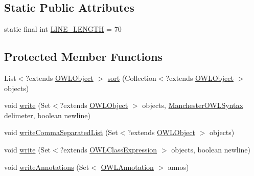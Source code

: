 \subsection*{Static Public Attributes}
\begin{DoxyCompactItemize}
\item 
static final int \hyperlink{classuk_1_1ac_1_1manchester_1_1cs_1_1owl_1_1owlapi_1_1mansyntaxrenderer_1_1_manchester_o_w_l_syntax_object_renderer_a8238358079714a9f748dca237bc812c1}{L\-I\-N\-E\-\_\-\-L\-E\-N\-G\-T\-H} = 70
\end{DoxyCompactItemize}
\subsection*{Protected Member Functions}
\begin{DoxyCompactItemize}
\item 
List$<$?extends \hyperlink{interfaceorg_1_1semanticweb_1_1owlapi_1_1model_1_1_o_w_l_object}{O\-W\-L\-Object} $>$ \hyperlink{classuk_1_1ac_1_1manchester_1_1cs_1_1owl_1_1owlapi_1_1mansyntaxrenderer_1_1_manchester_o_w_l_syntax_object_renderer_a65c526c7a3ef41403f52b64454b7b5df}{sort} (Collection$<$?extends \hyperlink{interfaceorg_1_1semanticweb_1_1owlapi_1_1model_1_1_o_w_l_object}{O\-W\-L\-Object} $>$ objects)
\item 
void \hyperlink{classuk_1_1ac_1_1manchester_1_1cs_1_1owl_1_1owlapi_1_1mansyntaxrenderer_1_1_manchester_o_w_l_syntax_object_renderer_aae345b82db32734de9626a87bda129be}{write} (Set$<$?extends \hyperlink{interfaceorg_1_1semanticweb_1_1owlapi_1_1model_1_1_o_w_l_object}{O\-W\-L\-Object} $>$ objects, \hyperlink{enumorg_1_1coode_1_1owlapi_1_1manchesterowlsyntax_1_1_manchester_o_w_l_syntax}{Manchester\-O\-W\-L\-Syntax} delimeter, boolean newline)
\item 
void \hyperlink{classuk_1_1ac_1_1manchester_1_1cs_1_1owl_1_1owlapi_1_1mansyntaxrenderer_1_1_manchester_o_w_l_syntax_object_renderer_ad72d51e884cf152e5fe8a67415908524}{write\-Comma\-Separated\-List} (Set$<$?extends \hyperlink{interfaceorg_1_1semanticweb_1_1owlapi_1_1model_1_1_o_w_l_object}{O\-W\-L\-Object} $>$ objects)
\item 
void \hyperlink{classuk_1_1ac_1_1manchester_1_1cs_1_1owl_1_1owlapi_1_1mansyntaxrenderer_1_1_manchester_o_w_l_syntax_object_renderer_a32218070b9a5815e7ec1ac51eef1f9b0}{write} (Set$<$?extends \hyperlink{interfaceorg_1_1semanticweb_1_1owlapi_1_1model_1_1_o_w_l_class_expression}{O\-W\-L\-Class\-Expression} $>$ objects, boolean newline)
\item 
void \hyperlink{classuk_1_1ac_1_1manchester_1_1cs_1_1owl_1_1owlapi_1_1mansyntaxrenderer_1_1_manchester_o_w_l_syntax_object_renderer_a5f0a77fb21f977079a851de51e168ced}{write\-Annotations} (Set$<$ \hyperlink{interfaceorg_1_1semanticweb_1_1owlapi_1_1model_1_1_o_w_l_annotation}{O\-W\-L\-Annotation} $>$ annos)
\end{DoxyCompactItemize}
